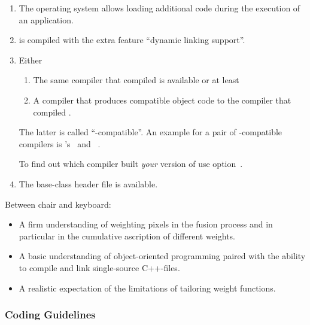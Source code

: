 \begin{enumerate}
\item
  The operating system allows loading additional code during the execution of an application.

\item
  \App{} is compiled with the extra feature ``dynamic linking support''.

\item
  Either

  \begin{enumerate}
  \item
    The same compiler that compiled \App{} is available or at least

  \item
    A compiler that produces compatible object code to the compiler that compiled \App{}.
  \end{enumerate}

  The latter is called ``-compatible''.  An example for a pair of
  -compatible compilers is 's~ and
  ~.

  To find out which compiler built \emph{your} version of \appcmd{} use
  option~.

\item
  The base-class header file  is available.
\end{enumerate}

Between chair and keyboard:

\begin{itemize}
\item
  A firm understanding of weighting pixels in the fusion process and in particular in the
  cumulative ascription of different weights.

\item
  A basic understanding of object-oriented programming paired with the ability to compile and
  link single-source C++-files.

\item
  A realistic expectation of the limitations of tailoring weight functions.
\end{itemize}


\subsubsection[Coding Guidelines]{\label{sec:coding-guidelines}%
  Coding Guidelines}

